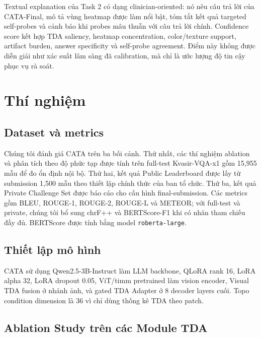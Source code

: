 \documentclass[11pt,a4paper]{article}
\begin{document}
Textual explanation của Task 2 có dạng clinician-oriented: nó nêu câu trả lời của CATA-Final, mô tả vùng heatmap được làm nổi bật, tóm tắt kết quả targeted self-probes và cảnh báo khi probes mâu thuẫn với câu trả lời chính. Confidence score kết hợp TDA saliency, heatmap concentration, color/texture support, artifact burden, answer specificity và self-probe agreement. Điểm này không được diễn giải như xác suất lâm sàng đã calibration, mà chỉ là ước lượng độ tin cậy phục vụ rà soát.

\section{Thí nghiệm}

\subsection{Dataset và metrics}

Chúng tôi đánh giá CATA trên ba bối cảnh. Thứ nhất, các thí nghiệm ablation và phân tích theo độ phức tạp được tính trên full-test Kvasir-VQA-x1 gồm 15,955 mẫu để đo ổn định nội bộ. Thứ hai, kết quả Public Leaderboard được lấy từ submission 1,500 mẫu theo thiết lập chính thức của ban tổ chức. Thứ ba, kết quả Private Challenge Set được báo cáo cho cấu hình final-submission. Các metrics gồm BLEU, ROUGE-1, ROUGE-2, ROUGE-L và METEOR; với full-test và private, chúng tôi bổ sung chrF++ và BERTScore-F1 khi có nhãn tham chiếu đầy đủ. BERTScore được tính bằng model \texttt{roberta-large}.

\subsection{Thiết lập mô hình}

CATA sử dụng Qwen2.5-3B-Instruct làm LLM backbone, QLoRA rank 16, LoRA alpha 32, LoRA dropout 0.05, ViT/timm pretrained làm vision encoder, Visual TDA fusion ở nhánh ảnh, và gated TDA Adapter ở 8 decoder layers cuối. Topo condition dimension là 36 vì chỉ dùng thống kê TDA theo patch.

\subsection{Ablation Study trên các Module TDA}
\end{document}
